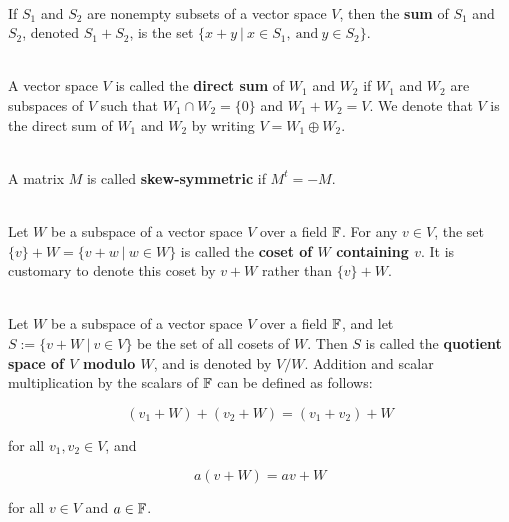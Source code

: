 \begin{definition}
	\hfill\\
	If $S_1$ and $S_2$ are nonempty subsets of a vector space $V$, then the \textbf{sum} of $S_1$ and $S_2$, denoted $S_1 + S_2$, is the set $\{x + y\ |\ x \in S_1,\ \text{and}\ y \in S_2\}$.
\end{definition}

\begin{definition}
	\hfill\\
	A vector space $V$ is called the \textbf{direct sum} of $W_1$ and $W_2$ if $W_1$ and $W_2$ are subspaces of $V$ such that $W_1 \cap W_2 = \{0\}$ and $W_1 + W_2 = V$. We denote that $V$ is the direct sum of $W_1$ and $W_2$ by writing $V = W_1 \oplus W_2$.
\end{definition}

\begin{definition}
	\hfill\\
	A matrix $M$ is called \textbf{skew-symmetric} if $M^t = -M$.
\end{definition}

\begin{definition}
	\hfill\\
	Let $W$ be a subspace of a vector space $V$ over a field $\mathbb{F}$. For any $v \in V$, the set $\{v\} + W = \{v + w\ |\ w \in W\}$ is called the \textbf{coset of $W$ containing $v$}. It is customary to denote this coset by $v + W$ rather than $\{v\} + W$.
\end{definition}

\begin{definition}
	\hfill\\
	Let $W$ be a subspace of a vector space $V$ over a field $\mathbb{F}$, and let $S := \{v + W\ |\ v \in V\}$ be the set of all cosets of $W$. Then $S$ is called the \textbf{quotient space of $V$ modulo $W$}, and is denoted by $V/W$. Addition and scalar multiplication by the scalars of $\mathbb{F}$ can be defined as follows:
	
	\[(v_1 + W) + (v_2 + W) = (v_1 + v_2) + W\]
	
	for all $v_1, v_2 \in V$, and
	
	\[a(v + W) = av + W\]
	
	for all $v \in V$ and $a \in \mathbb{F}$.
\end{definition}